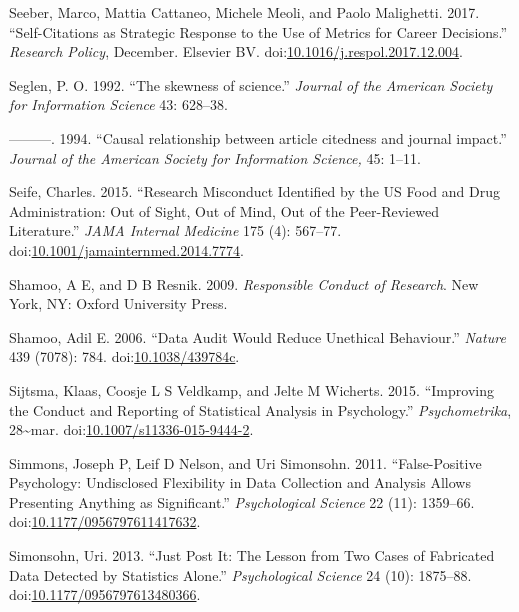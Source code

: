 \documentclass[a5paper]{book}
\begin{document}
\hypertarget{ref-doi:10.1016ux2fj.respol.2017.12.004}{}
Seeber, Marco, Mattia Cattaneo, Michele Meoli, and Paolo Malighetti.
2017. ``Self-Citations as Strategic Response to the Use of Metrics for
Career Decisions.'' \emph{Research Policy}, December. Elsevier BV.
doi:\href{https://doi.org/10.1016/j.respol.2017.12.004}{10.1016/j.respol.2017.12.004}.

\hypertarget{ref-Seglen1992}{}
Seglen, P. O. 1992. ``The skewness of science.'' \emph{Journal of the
American Society for Information Science} 43: 628--38.

\hypertarget{ref-Seglen1994}{}
---------. 1994. ``Causal relationship between article citedness and
journal impact.'' \emph{Journal of the American Society for Information
Science,} 45: 1--11.

\hypertarget{ref-doi:10.1001ux2fjamainternmed.2014.7774}{}
Seife, Charles. 2015. ``Research Misconduct Identified by the US Food
and Drug Administration: Out of Sight, Out of Mind, Out of the
Peer-Reviewed Literature.'' \emph{JAMA Internal Medicine} 175 (4):
567--77.
doi:\href{https://doi.org/10.1001/jamainternmed.2014.7774}{10.1001/jamainternmed.2014.7774}.

\hypertarget{ref-isbn:9780199376025}{}
Shamoo, A E, and D B Resnik. 2009. \emph{Responsible Conduct of
Research}. New York, NY: Oxford University Press.

\hypertarget{ref-doi:10.1038ux2f439784c}{}
Shamoo, Adil E. 2006. ``Data Audit Would Reduce Unethical Behaviour.''
\emph{Nature} 439 (7078): 784.
doi:\href{https://doi.org/10.1038/439784c}{10.1038/439784c}.

\hypertarget{ref-doi:10.1007ux2fs11336-015-9444-2}{}
Sijtsma, Klaas, Coosje L S Veldkamp, and Jelte M Wicherts. 2015.
``Improving the Conduct and Reporting of Statistical Analysis in
Psychology.'' \emph{Psychometrika}, 28\textasciitilde{}mar.
doi:\href{https://doi.org/10.1007/s11336-015-9444-2}{10.1007/s11336-015-9444-2}.

\hypertarget{ref-doi:10.1177ux2f0956797611417632}{}
Simmons, Joseph P, Leif D Nelson, and Uri Simonsohn. 2011.
``False-Positive Psychology: Undisclosed Flexibility in Data Collection
and Analysis Allows Presenting Anything as Significant.''
\emph{Psychological Science} 22 (11): 1359--66.
doi:\href{https://doi.org/10.1177/0956797611417632}{10.1177/0956797611417632}.

\hypertarget{ref-doi:10.1177ux2f0956797613480366}{}
Simonsohn, Uri. 2013. ``Just Post It: The Lesson from Two Cases of
Fabricated Data Detected by Statistics Alone.'' \emph{Psychological
Science} 24 (10): 1875--88.
doi:\href{https://doi.org/10.1177/0956797613480366}{10.1177/0956797613480366}.
\end{document}
